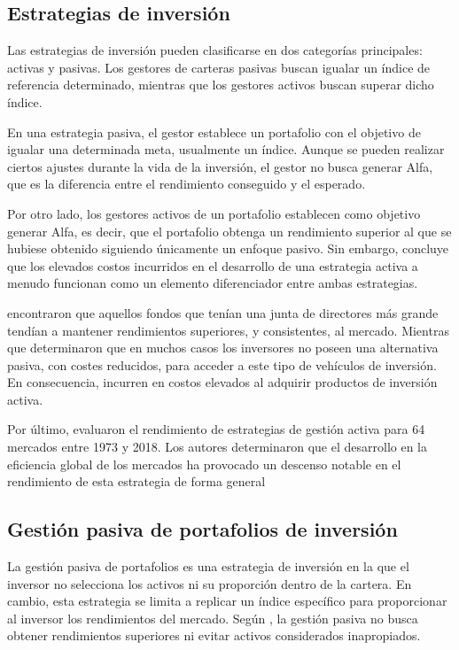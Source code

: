 \documentclass[a4paper,fleqn]{cas-sc}
\begin{document}
\subsection{Estrategias de inversión}

Las estrategias de inversión pueden clasificarse en dos categorías principales: activas y pasivas. Los gestores de carteras pasivas buscan igualar un índice de referencia determinado, mientras que los gestores activos buscan superar dicho índice.

En una estrategia pasiva, el gestor establece un portafolio con el objetivo de igualar una determinada meta, usualmente un índice. Aunque se pueden realizar ciertos ajustes durante la vida de la inversión, el gestor no busca generar Alfa, que es la diferencia entre el rendimiento conseguido y el esperado.

Por otro lado, los gestores activos de un portafolio establecen como objetivo generar Alfa, es decir, que el portafolio obtenga un rendimiento superior al que se hubiese obtenido siguiendo únicamente un enfoque pasivo. Sin embargo, \cite{Malkiel2013} concluye que los elevados costos incurridos en el desarrollo de una estrategia activa a menudo funcionan como un elemento diferenciador entre ambas estrategias.

\cite{Ding} encontraron que aquellos fondos que tenían una junta de directores más grande tendían a mantener rendimientos superiores, y consistentes, al mercado. Mientras que \cite{Cremers} determinaron que en muchos casos los inversores no poseen una alternativa pasiva, con costes reducidos, para acceder a este tipo de vehículos de inversión. En consecuencia, incurren en costos elevados al adquirir productos de inversión activa.

Por último, \cite{Zaremba} evaluaron el rendimiento de estrategias de gestión activa para 64 mercados entre 1973 y 2018. Los autores determinaron que el desarrollo en la eficiencia global de los mercados ha provocado un descenso notable en el rendimiento de esta estrategia de forma general

\subsection{Gestión pasiva de portafolios de inversión}

La gestión pasiva de portafolios es una estrategia de inversión en la que el inversor no selecciona los activos ni su proporción dentro de la cartera. En cambio, esta estrategia se limita a replicar un índice específico para proporcionar al inversor los rendimientos del mercado. Según \cite{Sorensen}, la gestión pasiva no busca obtener rendimientos superiores ni evitar activos considerados inapropiados.
\end{document}

